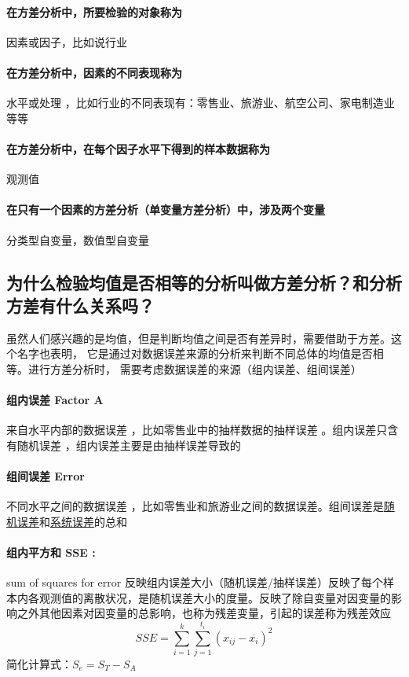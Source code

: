 \documentclass[UTF8,10pt]{book}
\begin{document}
{\paragraph{在方差分析中，所要检验的对象称为}	因素或因子，比如说行业
\paragraph{在方差分析中，因素的不同表现称为}	水平或处理 ，比如行业的不同表现有：零售业、旅游业、航空公司、家电制造业等等
\paragraph{在方差分析中，在每个因子水平下得到的样本数据称为}	观测值
\paragraph{在只有一个因素的方差分析（单变量方差分析）中，涉及两个变量}	分类型自变量，数值型自变量

\subsection{为什么检验均值是否相等的分析叫做方差分析？和分析方差有什么关系吗？}
    虽然人们感兴趣的是均值，但是判断均值之间是否有差异时，需要借助于方差。这个名字也表明，
    它是通过对数据误差来源的分析来判断不同总体的均值是否相等。进行方差分析时，
    需要考虑数据误差的来源（组内误差、组间误差）

    \paragraph{组内误差 Factor A}	来自水平内部的数据误差 ，比如零售业中的抽样数据的抽样误差 。组内误差只含有随机误差 ，组内误差主要是由抽样误差导致的

    \paragraph{组间误差 Error}	不同水平之间的数据误差 ，比如零售业和旅游业之间的数据误差。组间误差是\underline{随机误差}和\underline{系统误差}的总和

    \paragraph{组内平方和 SSE :} sum of squares for error	反映组内误差大小（随机误差/抽样误差）反映了每个样本内各观测值的离散状况，是随机误差大小的度量。反映了除自变量对因变量的影响之外其他因素对因变量的总影响，也称为残差变量，引起的误差称为残差效应$$ SSE = \sum_{i=1}^k \sum_{j=1}^{t_i} (x_{ij}-\overline{x_i})^2 $$ 简化计算式：$ S_e = S_T - S_A $

}
\end{document}
